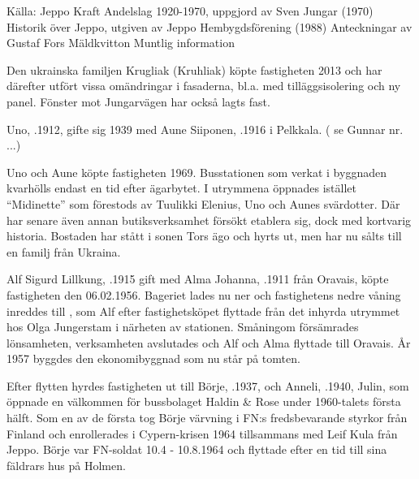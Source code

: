 Källa: 	Jeppo Kraft Andelslag 1920-1970, uppgjord av Sven Jungar (1970)
	Historik över Jeppo, utgiven av Jeppo Hembygdsförening (1988)
	Anteckningar av Gustaf Fors
	Mäldkvitton
	Muntlig information




Den ukrainska familjen Krugliak (Kruhliak) köpte fastigheten 2013 och har därefter utfört vissa omändringar i fasaderna, bl.a. med tilläggsisolering och ny panel. Fönster mot Jungarvägen har också lagts fast.


Uno, .1912, gifte sig 1939 med Aune Siiponen, .1916 i Pelkkala. ( se Gunnar nr. ...)

\begin{jhchildren}
  \item {}
  \item {}
  \item {}
  \item {}
\end{jhchildren}


Uno och Aune köpte fastigheten 1969. Busstationen som verkat i byggnaden kvarhölls endast en tid efter ägarbytet. I utrymmena öppnades istället  ``Midinette'' som förestods av Tuulikki Elenius, Uno och Aunes svärdotter. Där har senare även annan butiksverksamhet försökt etablera sig, dock med kortvarig historia. Bostaden har stått i sonen Tors ägo och hyrts ut, men har nu sålts till en familj från Ukraina.



Alf Sigurd Lillkung, .1915 gift med Alma Johanna, .1911 från Oravais, köpte fastigheten den 06.02.1956. Bageriet lades nu ner och fastighetens nedre våning inreddes till , som Alf efter fastighetsköpet flyttade från det inhyrda utrymmet hos Olga Jungerstam i närheten av stationen. Småningom försämrades lönsamheten, verksamheten avslutades och Alf och Alma flyttade till Oravais. År 1957 byggdes den ekonomibyggnad som nu står på tomten.

Efter flytten hyrdes fastigheten ut till Börje, .1937, och Anneli, .1940, Julin, som öppnade en välkommen  för bussbolaget Haldin \& Rose under 1960-talets första hälft. Som en av de första tog Börje värvning i FN:s fredsbevarande styrkor från Finland och enrollerades i Cypern-krisen 1964 tillsammans med Leif Kula från Jeppo. Börje var FN-soldat 10.4  -  10.8.1964 och flyttade efter en tid till sina fäldrars hus på Holmen.

